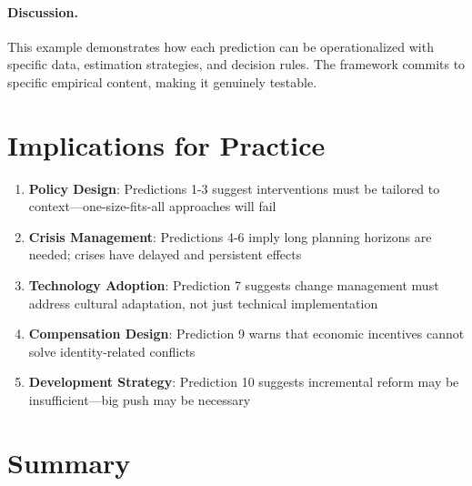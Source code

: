 \paragraph{Discussion.}
This example demonstrates how each prediction can be operationalized with specific data, estimation strategies, and decision rules. The framework commits to specific empirical content, making it genuinely testable.


\section{Implications for Practice}
\label{sec:S-practice}

\begin{tcolorbox}[colback=green!5!white, colframe=green!75!black,
    title=Practical Implications]
\begin{enumerate}
\item \textbf{Policy Design}: Predictions 1-3 suggest interventions must be tailored to context---one-size-fits-all approaches will fail
\item \textbf{Crisis Management}: Predictions 4-6 imply long planning horizons are needed; crises have delayed and persistent effects
\item \textbf{Technology Adoption}: Prediction 7 suggests change management must address cultural adaptation, not just technical implementation
\item \textbf{Compensation Design}: Prediction 9 warns that economic incentives cannot solve identity-related conflicts
\item \textbf{Development Strategy}: Prediction 10 suggests incremental reform may be insufficient---big push may be necessary
\end{enumerate}
\end{tcolorbox}



\section{Summary}
\label{sec:S-summary}

